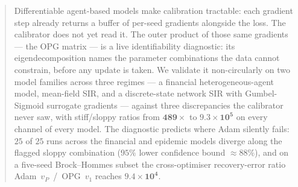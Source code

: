 \begin{abstract}
Differentiable agent-based models make calibration tractable: each gradient step already returns a buffer of per-seed gradients alongside the loss. The calibrator does not yet read it. The outer product of those same gradients --- the OPG matrix --- is a live identifiability diagnostic: its eigendecomposition names the parameter combinations the data cannot constrain, before any update is taken. We validate it non-circularly on two model families across three regimes --- a financial heterogeneous-agent model, mean-field SIR, and a discrete-state network SIR with Gumbel-Sigmoid surrogate gradients --- against three discrepancies the calibrator never saw, with stiff/sloppy ratios from $\mathbf{489\times}$ to $\mathbf{9.3 \times 10^5}$ on every channel of every model. The diagnostic predicts where Adam silently fails: $25$ of $25$ runs across the financial and epidemic models diverge along the flagged sloppy combination ($95\%$ lower confidence bound $\approx 88\%$), and on a five-seed Brock--Hommes subset the cross-optimiser recovery-error ratio Adam~$v_P$~/~OPG~$v_1$ reaches $\mathbf{9.4 \times 10^4}$.
\end{abstract}
